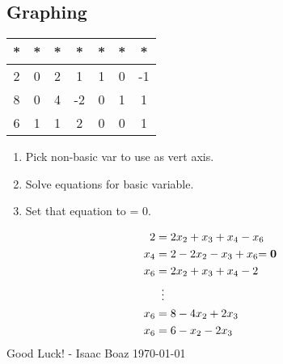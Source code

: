 \documentclass[10pt]{article}
\begin{document}
\begin{multicols*}{2}
\begin{minipage}{\columnwidth}
        \subsection*{Graphing}
        \begin{minipage}{0.4\columnwidth}
            \begin{tabular}{c|cccccc}
                * & * & * & *  & * & * & *  \\
                \hline
                2 & 0 & 2 & 1  & 1 & 0 & -1 \\
                8 & 0 & 4 & -2 & 0 & 1 & 1  \\
                6 & 1 & 1 & 2  & 0 & 0 & 1
            \end{tabular}
        \end{minipage}
        \columnbreak
        \begin{minipage}{0.7\columnwidth}
            \begin{enumerate}
                \item Pick non-basic var to use as vert axis.
                \item Solve equations for basic variable.
                \item Set that equation to = 0.
            \end{enumerate}
        \end{minipage}
        \begin{align*}
            2   & = 2x_2 + x_3 + x_4 - x_6                \\
            x_4 & = 2 - 2x_2 - x_3 + x_6 \mathbf{= 0}     \\
            x_6 & = 2x_2 + x_3 + x_4 - 2                  \\
                & \mathrel{\makebox[\widthof{=}]{\vdots}} \\
            x_6 & = 8 - 4x_2 + 2x_3                       \\
            x_6 & = 6 - x_2 - 2x_3
        \end{align*}
        Good Luck! - Isaac Boaz \today
    \end{minipage}
    \columnbreak \\
    \begin{minipage}{\columnwidth}

\end{minipage}
\end{multicols*}
\end{document}

